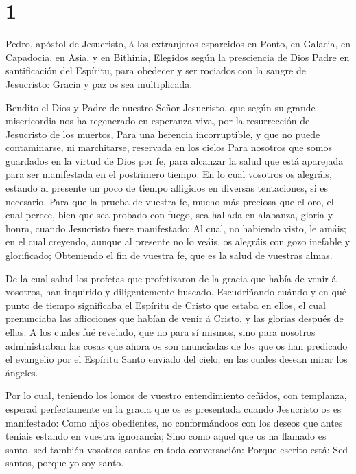 \hypertarget{section}{%
\section{1}\label{section}}

 Pedro, apóstol de Jesucristo, á los extranjeros esparcidos
en Ponto, en Galacia, en Capadocia, en Asia, y en Bithinia, 
Elegidos según la presciencia de Dios Padre en santificación del
Espíritu, para obedecer y ser rociados con la sangre de Jesucristo:
Gracia y paz os sea multiplicada.

 Bendito el Dios y Padre de nuestro Señor Jesucristo, que
según su grande misericordia nos ha regenerado en esperanza viva, por la
resurrección de Jesucristo de los muertos,  Para una
herencia incorruptible, y que no puede contaminarse, ni marchitarse,
reservada en los cielos  Para nosotros que somos guardados
en la virtud de Dios por fe, para alcanzar la salud que está aparejada
para ser manifestada en el postrimero tiempo.  En lo cual
vosotros os alegráis, estando al presente un poco de tiempo afligidos en
diversas tentaciones, si es necesario,  Para que la prueba
de vuestra fe, mucho más preciosa que el oro, el cual perece, bien que
sea probado con fuego, sea hallada en alabanza, gloria y honra, cuando
Jesucristo fuere manifestado:  Al cual, no habiendo visto,
le amáis; en el cual creyendo, aunque al presente no lo veáis, os
alegráis con gozo inefable y glorificado;  Obteniendo el fin
de vuestra fe, que es la salud de vuestras almas.

 De la cual salud los profetas que profetizaron de la
gracia que había de venir á vosotros, han inquirido y diligentemente
buscado,  Escudriñando cuándo y en qué punto de tiempo
significaba el Espíritu de Cristo que estaba en ellos, el cual
prenunciaba las aflicciones que habían de venir á Cristo, y las glorias
después de ellas.  A los cuales fué revelado, que no para
sí mismos, sino para nosotros administraban las cosas que ahora os son
anunciadas de los que os han predicado el evangelio por el Espíritu
Santo enviado del cielo; en las cuales desean mirar los ángeles.

 Por lo cual, teniendo los lomos de vuestro entendimiento
ceñidos, con templanza, esperad perfectamente en la gracia que os es
presentada cuando Jesucristo os es manifestado:  Como hijos
obedientes, no conformándoos con los deseos que antes teníais estando en
vuestra ignorancia;  Sino como aquel que os ha llamado es
santo, sed también vosotros santos en toda conversación: 
Porque escrito está: Sed santos, porque yo soy santo.

